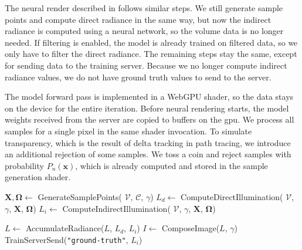 The neural render described in  follows similar steps. We still
generate sample points and compute direct radiance in the same way, but now the
indirect radiance is computed using a neural network, so the volume data is no
longer needed. If filtering is enabled, the model is already trained on filtered
data, so we only have to filter the direct radiance. The remaining steps stay
the same, except for sending data to the training server. Because we no longer
compute indirect radiance values, we do not have ground truth values to send to
the server.

The model forward pass is implemented in a WebGPU shader, so the data stays on
the device for the entire iteration. Before neural rendering starts, the model
weights received from the server are copied to buffers on the \ac{gpu}. We
process all samples for a single pixel in the same shader invocation. To simulate
transparency, which is the result of delta tracking in path tracing, we introduce
an additional rejection of some samples. We toss a coin and reject samples with
probability $P_n(\mathbf{x})$, which is already computed and stored in the sample
generation shader.

\begin{algorithm}
    \caption{Path tracing}
    \label{alg:pt}
    \DontPrintSemicolon
    \BlankLine
    
    $\mathbf{X}, \boldsymbol\Omega \leftarrow$ GenerateSamplePoints(%
        $\mathcal{V}$, $\mathcal{C}$, $\gamma$)\;
    $L_d \leftarrow$ ComputeDirectIllumination(%
        $\mathcal{V}$, $\gamma$, $\mathbf{X}$, $\boldsymbol\Omega$)\;
    $L_i \leftarrow$ ComputeIndirectIllumination(%
        $\mathcal{V}$, $\gamma$, $\mathbf{X}$, $\boldsymbol\Omega$)\;
    \BlankLine

    \BlankLine
    
    $L \leftarrow$ AccumulateRadiance($L$, $L_d$, $L_i$)\;
    $I \leftarrow$ ComposeImage($L$, $\gamma$) \;
    TrainServerSend(\texttt{"ground-truth"}, $L_i$)\;
    \BlankLine
    
\end{algorithm}

